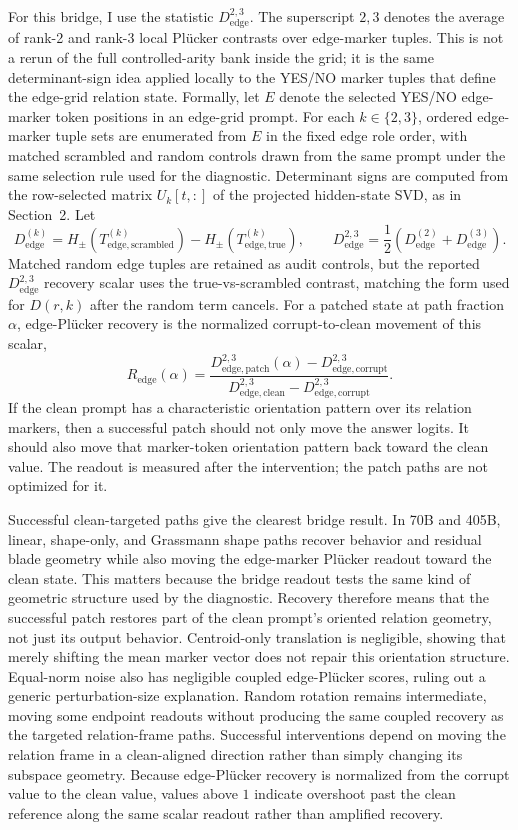 \documentclass[11pt]{article}
\newcommand{\Hpm}{H_{\pm}}
\begin{document}
For this bridge, I use the statistic \(D^{2,3}_{\mathrm{edge}}\). The superscript \(2,3\) denotes the average of rank-2 and rank-3 local Pl\"ucker contrasts over edge-marker tuples. This is not a rerun of the full controlled-arity bank inside the grid; it is the same determinant-sign idea applied locally to the YES/NO marker tuples that define the edge-grid relation state. Formally, let \(E\) denote the selected YES/NO edge-marker token positions in an edge-grid prompt. For each \(k\in\{2,3\}\), ordered edge-marker tuple sets are enumerated from \(E\) in the fixed edge role order, with matched scrambled and random controls drawn from the same prompt under the same selection rule used for the diagnostic. Determinant signs are computed from the row-selected matrix \(U_k[t,:]\) of the projected hidden-state SVD, as in Section~2. Let
\[
D_{\mathrm{edge}}^{(k)}=\Hpm(T_{\mathrm{edge,scrambled}}^{(k)})-\Hpm(T_{\mathrm{edge,true}}^{(k)}),
\qquad
D_{\mathrm{edge}}^{2,3}=\frac{1}{2}\left(D_{\mathrm{edge}}^{(2)}+D_{\mathrm{edge}}^{(3)}\right).
\]
Matched random edge tuples are retained as audit controls, but the reported \(D^{2,3}_{\mathrm{edge}}\) recovery scalar uses the true-vs-scrambled contrast, matching the form used for \(D(r,k)\) after the random term cancels.
For a patched state at path fraction \(\alpha\), edge-Pl\"ucker recovery is the normalized corrupt-to-clean movement of this scalar,
\[
R_{\mathrm{edge}}(\alpha)=
\frac{D_{\mathrm{edge,patch}}^{2,3}(\alpha)-D_{\mathrm{edge,corrupt}}^{2,3}}
{D_{\mathrm{edge,clean}}^{2,3}-D_{\mathrm{edge,corrupt}}^{2,3}}.
\]
If the clean prompt has a characteristic orientation pattern over its relation markers, then a successful patch should not only move the answer logits. It should also move that marker-token orientation pattern back toward the clean value. The readout is measured after the intervention; the patch paths are not optimized for it.

Successful clean-targeted paths give the clearest bridge result. In 70B and 405B, linear, shape-only, and Grassmann shape paths recover behavior and residual blade geometry while also moving the edge-marker Pl\"ucker readout toward the clean state. This matters because the bridge readout tests the same kind of geometric structure used by the diagnostic. Recovery therefore means that the successful patch restores part of the clean prompt's oriented relation geometry, not just its output behavior. Centroid-only translation is negligible, showing that merely shifting the mean marker vector does not repair this orientation structure. Equal-norm noise also has negligible coupled edge-Pl\"ucker scores, ruling out a generic perturbation-size explanation. Random rotation remains intermediate, moving some endpoint readouts without producing the same coupled recovery as the targeted relation-frame paths. Successful interventions depend on moving the relation frame in a clean-aligned direction rather than simply changing its subspace geometry. Because edge-Pl\"ucker recovery is normalized from the corrupt value to the clean value, values above \(1\) indicate overshoot past the clean reference along the same scalar readout rather than amplified recovery.
\end{document}
